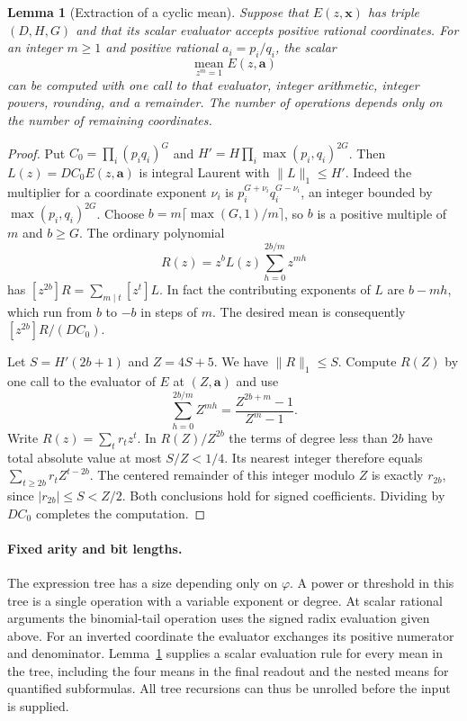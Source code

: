 \documentclass[11pt,letterpaper]{article}
\newtheorem{lemma}[theorem]{Lemma}
\numberwithin{equation}{section}
\begin{document}
\begin{lemma}[Extraction of a cyclic mean]\label{lem:mean-extract}
Suppose that $E(z,\mathbf x)$ has triple $(D,H,G)$ and that its scalar evaluator accepts positive rational coordinates. For an integer $m\ge1$ and positive rational $a_i=p_i/q_i$, the scalar
\[
       \underset{z^m=1}{\operatorname{mean}} E(z,\mathbf a)
\]
can be computed with one call to that evaluator, integer arithmetic, integer powers, rounding, and a remainder. The number of operations depends only on the number of remaining coordinates.
\end{lemma}
\begin{proof}
Put $C_0=\prod_i(p_iq_i)^G$ and $H'=H\prod_i\max(p_i,q_i)^{2G}$. Then $L(z)=DC_0E(z,\mathbf a)$ is integral Laurent with $\|L\|_1\le H'$. Indeed the multiplier for a coordinate exponent $\nu_i$ is $p_i^{G+\nu_i}q_i^{G-\nu_i}$, an integer bounded by $\max(p_i,q_i)^{2G}$. Choose $b=m\lceil\max(G,1)/m\rceil$, so $b$ is a positive multiple of $m$ and $b\ge G$. The ordinary polynomial
\[
                 R(z)=z^b L(z)\sum_{h=0}^{2b/m}z^{mh}
\]
has $[z^{2b}]R=\sum_{m\mid t}[z^t]L$. In fact the contributing exponents of $L$ are $b-mh$, which run from $b$ to $-b$ in steps of $m$. The desired mean is consequently $[z^{2b}]R/(DC_0)$.

Let $S=H'(2b+1)$ and $Z=4S+5$. We have $\|R\|_1\le S$. Compute $R(Z)$ by one call to the evaluator of $E$ at $(Z,\mathbf a)$ and use
\[
                    \sum_{h=0}^{2b/m} Z^{mh}
                       =\frac{Z^{2b+m}-1}{Z^m-1}.
\]
Write $R(z)=\sum_t r_tz^t$. In $R(Z)/Z^{2b}$ the terms of degree less than $2b$ have total absolute value at most $S/Z<1/4$. Its nearest integer therefore equals $\sum_{t\ge2b}r_tZ^{t-2b}$. The centered remainder of this integer modulo $Z$ is exactly $r_{2b}$, since $|r_{2b}|\le S<Z/2$. Both conclusions hold for signed coefficients. Dividing by $DC_0$ completes the computation.
\end{proof}

\paragraph{Fixed arity and bit lengths.}
The expression tree has a size depending only on $\varphi$. A power or threshold in this tree is a single operation with a variable exponent or degree. At scalar rational arguments the binomial-tail operation uses the signed radix evaluation given above. For an inverted coordinate the evaluator exchanges its positive numerator and denominator. Lemma~\ref{lem:mean-extract} supplies a scalar evaluation rule for every mean in the tree, including the four means in the final readout and the nested means for quantified subformulas. All tree recursions can thus be unrolled before the input is supplied.
\end{document}
